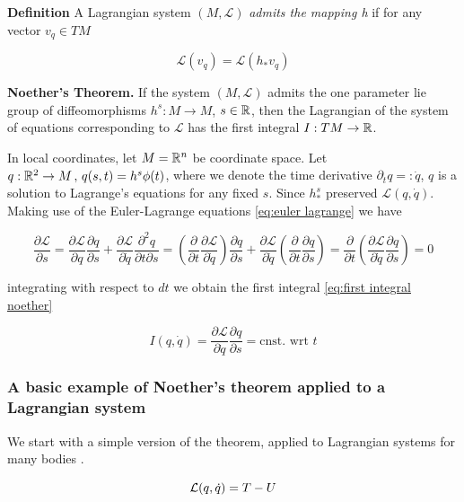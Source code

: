 \documentclass[12pt]{article}
\begin{document}
\textbf{Definition} A Lagrangian system $(M,\mathcal L)$ \textit{admits the mapping h} if for any vector $v_q\in TM$

$$\mathcal L(v_q) = \mathcal L(h_*v_q)$$

\textbf{Noether's Theorem.} If the system $(M,\mathcal L)$ admits the one parameter lie group of diffeomorphisms $h^s : M\to M$, $s\in \mathbb{R}$, then the Lagrangian of the system of equations corresponding to $\mathcal L$ has the first integral $I : TM\to \mathbb{R}$. 

In local coordinates, let $M = \mathbb{R}^n$ be coordinate space. Let $q : \mathbb{R}^2\to M\,,\,q(s,t) = h^s\phi(t)$, where we denote the time derivative $\partial_t q =: \dot q$, $q$ is a solution to Lagrange's equations for any fixed $s$. Since $h^s_*$ preserved $\mathcal L(q,\dot q)$. Making use of the Euler-Lagrange equations \eqref{eq:euler lagrange} we have 

\begin{equation}\label{eq:noether derivaiton}
\frac{\partial \mathcal L}{\partial s} = \frac{\partial \mathcal L}{\partial q}\frac{\partial q}{\partial s} + \frac{\partial \mathcal L}{\partial \dot q}\frac{\partial^2 q}{\partial t\partial s} = 
\left(\frac{\partial}{\partial t} \frac{\partial \mathcal L}{\partial \dot q}\right) \frac{\partial q}{\partial s} + \frac{\partial \mathcal L}{\partial \dot q}\left( \frac{\partial }{\partial t}\frac{\partial q}{\partial s} \right) 
= 
\frac{\partial}{\partial t}\left( \frac{\partial \mathcal L}{\partial \dot q}\frac{\partial q}{\partial s} \right) = 0
\end{equation}

integrating with respect to $dt$ we obtain the first integral \eqref{eq:first integral noether}

\begin{equation}\label{eq:first integral noether}
    I(q,\dot q) = \frac{\partial \mathcal L}{\partial\dot q}\frac{\partial q}{\partial s} = \text{cnst. wrt } t
\end{equation}

\subsubsection{A basic example of Noether's theorem applied to a Lagrangian system}
We start with a simple version of the theorem, applied to Lagrangian systems for many bodies \cite{Morin}.

\begin{equation}\label{eq:lagrangian}
    \mathcal L(q,\dot q) = T - U
\end{equation}
\end{document}
